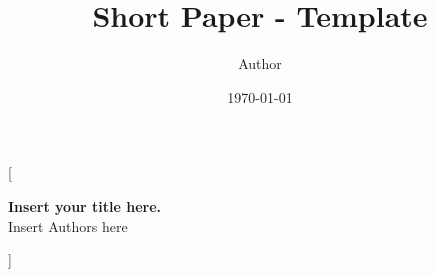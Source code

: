 \documentclass{article}
\title{Short Paper - Template}
\author{Author}
\date{\today}
\begin{document}
\twocolumn
[{
            \LARGE
            \textcolor{titleColor}{\textbf{Insert your title here.}}\vspace{1ex}\\
            \large
            \textcolor{authorColor}{Insert Authors here}
            \vspace{1ex}
            \normalsize
            \begin{tcolorbox}[  colback = abstractColor,
                    ,
                    width=\linewidth,
                    arc=1mm, auto outer arc,
                ]
                \justifying
                
            \end{tcolorbox}
            \vspace{1.5ex}
        }]








\newpage

\onecolumn


\begin{appendices}
    
\end{appendices}
\end{document}
